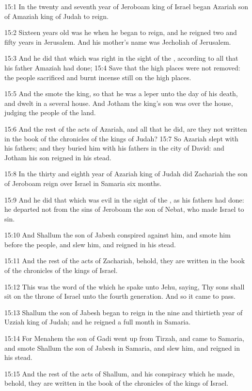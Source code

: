 15:1 In the twenty and seventh year of Jeroboam king of Israel began
Azariah son of Amaziah king of Judah to reign.

15:2 Sixteen years old was he when he began to reign, and he reigned
two and fifty years in Jerusalem. And his mother's name was Jecholiah
of Jerusalem.

15:3 And he did that which was right in the sight of the \LORD,
according to all that his father Amaziah had done; 15:4 Save that the
high places were not removed: the people sacrificed and burnt incense
still on the high places.

15:5 And the \LORD smote the king, so that he was a leper unto the day
of his death, and dwelt in a several house. And Jotham the king's son
was over the house, judging the people of the land.

15:6 And the rest of the acts of Azariah, and all that he did, are
they not written in the book of the chronicles of the kings of Judah?
15:7 So Azariah slept with his fathers; and they buried him with his
fathers in the city of David: and Jotham his son reigned in his stead.

15:8 In the thirty and eighth year of Azariah king of Judah did
Zachariah the son of Jeroboam reign over Israel in Samaria six months.

15:9 And he did that which was evil in the sight of the \LORD, as his
fathers had done: he departed not from the sins of Jeroboam the son of
Nebat, who made Israel to sin.

15:10 And Shallum the son of Jabesh conspired against him, and smote
him before the people, and slew him, and reigned in his stead.

15:11 And the rest of the acts of Zachariah, behold, they are written
in the book of the chronicles of the kings of Israel.

15:12 This was the word of the \LORD which he spake unto Jehu, saying,
Thy sons shall sit on the throne of Israel unto the fourth generation.
And so it came to pass.

15:13 Shallum the son of Jabesh began to reign in the nine and
thirtieth year of Uzziah king of Judah; and he reigned a full month in
Samaria.

15:14 For Menahem the son of Gadi went up from Tirzah, and came to
Samaria, and smote Shallum the son of Jabesh in Samaria, and slew him,
and reigned in his stead.

15:15 And the rest of the acts of Shallum, and his conspiracy which he
made, behold, they are written in the book of the chronicles of the
kings of Israel.

